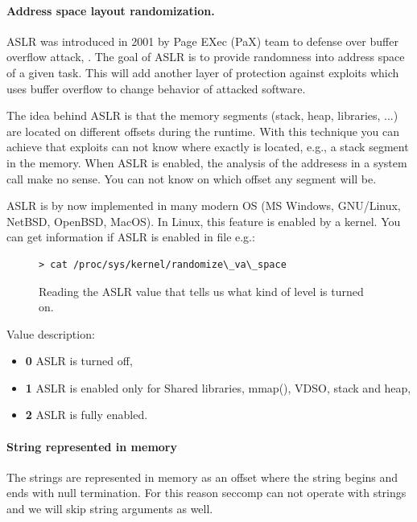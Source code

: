 \paragraph{Address space layout randomization.}
ASLR was introduced in 2001 by Page EXec (PaX) team to defense over buffer
overflow attack, \cite{ASLR:PAX, Ganz2017}. The goal of ASLR is to provide
randomness into address space of a given task. This will add another layer of
protection against exploits which uses buffer overflow to change behavior of
attacked software.

The idea behind ASLR is that the memory segments (stack, heap, libraries, ...)
are located on different offsets during the runtime. With this technique you can
achieve that exploits can not know where exactly is located, e.g., a stack
segment in the memory. When ASLR is enabled, the analysis of the addresess in
a system call make no sense. You can not know on which offset any segment will be.

ASLR is by now implemented in many modern OS (MS Windows, GNU/Linux, NetBSD, OpenBSD, MacOS).
In Linux, this feature is enabled by a kernel. You can get information if ASLR is enabled in file e.g.:

\begin{figure}[H]
	\lstset{style=npl}
\begin{lstlisting}
> cat /proc/sys/kernel/randomize\_va\_space
\end{lstlisting}
	\caption{Reading the ASLR value that tells us what kind of level is turned on.}
	\label{ASLR_getValue}
\end{figure}

Value description:
\begin{itemize}
	\item \textbf{0} ASLR is turned off,
	\item \textbf{1} ASLR is enabled only for Shared libraries,  mmap(), VDSO, stack and heap,
	\item \textbf{2} ASLR is fully enabled.
\end{itemize}


\paragraph{String represented in memory}
The strings are represented in memory as an offset where the string
begins and ends with null termination. \cite{ISO9899}
For this reason seccomp can not operate with strings and we will skip string arguments as well.

